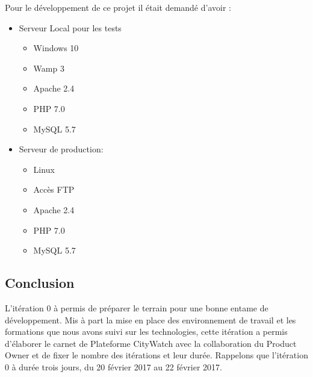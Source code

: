 Pour le développement de ce projet il était demandé d'avoir :
\begin{itemize}
 \item Serveur Local pour les tests
     \begin{itemize}
         \item Windows 10
         \item Wamp 3
         \item Apache 2.4
         \item PHP 7.0
         \item MySQL 5.7
     \end{itemize}
 \item Serveur de production:
     \begin{itemize}
      \item Linux
      \item Accès FTP
      \item Apache 2.4
      \item PHP 7.0
      \item MySQL 5.7
     \end{itemize}
\end{itemize}

\subsection{Conclusion}

L'itération 0 à permis de préparer le terrain pour une bonne entame de
développement. Mis à part la mise en place des environnement de travail et les
formations que nous avons suivi sur les technologies, cette itération a permis
d'élaborer le carnet de Plateforme CityWatch avec la collaboration du Product
Owner et de fixer le nombre des itérations et leur durée. Rappelons que
l'itération 0 à durée trois jours, du 20 février 2017 au 22 février 2017.
